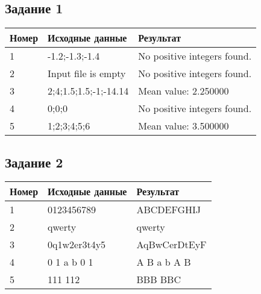 \subsection*{\centering Задание 1}
\begin{table}[h]
  \centering
  \begin{tabular}{|l|l|l|}
      \hline
      Номер & Исходные данные       & Результат\\[2ex] \hline
      1     & -1.2;-1.3;-1.4        & No positive integers found.\\[2ex] \hline
      2     & Input file is empty   & No positive integers found.\\[2ex] \hline
      3     & 2;4;1.5;1.5;-1;-14.14 & Mean value: 2.250000\\[2ex] \hline
      4     & 0;0;0                 & No positive integers found.\\[2ex] \hline
      5     & 1;2;3;4;5;6           & Mean value: 3.500000\\ \hline
  \end{tabular}
\end{table}

\subsection*{\centering Задание 2}
\begin{table}[h]
  \centering
  \begin{tabular}{|l|l|l|}
    \hline
    Номер & Исходные данные   & Результат \\[2ex] \hline  
    1     & 0123456789        & ABCDEFGHIJ   \\[0.2ex] \hline
    2     & qwerty            & qwerty \\[0.2ex] \hline
    3     & 0q1w2er3t4y5      & AqBwCerDtEyF \\[0.2ex] \hline
    4     & 0 1 a b 0 1       & A B a b A B \\[0.2ex] \hline
    5     & 111 112           & BBB BBC \\ \hline
  \end{tabular}
\end{table}